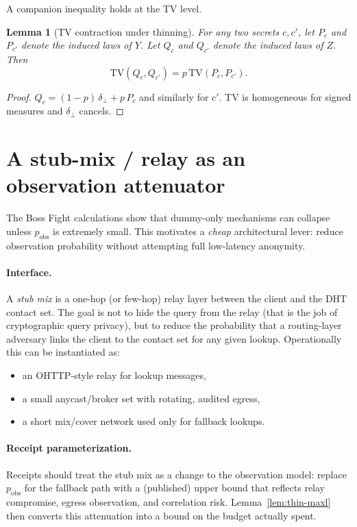 \documentclass[11pt]{article}
\newtheorem{lemma}{Lemma}
\theoremstyle{definition}
\newcommand{\TV}{\mathrm{TV}}
\begin{document}
A companion inequality holds at the TV level.

\begin{lemma}[TV contraction under thinning]\label{lem:thin-tv}
For any two secrets $c,c'$, let $P_c$ and $P_{c'}$ denote the induced laws of $Y$.
Let $Q_c$ and $Q_{c'}$ denote the induced laws of $Z$.
Then
\[ \TV(Q_c,Q_{c'}) = p\,\TV(P_c,P_{c'}). \]
\end{lemma}
\begin{proof}
$Q_c = (1-p)\,\delta_{\bot} + p\,P_c$ and similarly for $c'$.
TV is homogeneous for signed measures and $\delta_{\bot}$ cancels.
\end{proof}

\section{A stub-mix / relay as an observation attenuator}
The Boss Fight calculations show that dummy-only mechanisms can collapse unless $p_{\mathrm{obs}}$ is extremely small.\cite{series:bossfightB}
This motivates a \emph{cheap} architectural lever:
reduce observation probability without attempting full low-latency anonymity.

\paragraph{Interface.}
A \emph{stub mix} is a one-hop (or few-hop) relay layer between the client and the DHT contact set.
The goal is not to hide the query from the relay (that is the job of cryptographic query privacy), but to reduce the probability that a routing-layer adversary links the client to the contact set for any given lookup.
Operationally this can be instantiated as:
\begin{itemize}[leftmargin=1.2em]
\item an OHTTP-style relay for lookup messages,
\item a small anycast/broker set with rotating, audited egress,
\item a short mix/cover network used only for fallback lookups.
\end{itemize}

\paragraph{Receipt parameterization.}
Receipts should treat the stub mix as a change to the observation model:
replace $p_{\mathrm{obs}}$ for the fallback path with a (published) upper bound that reflects relay compromise, egress observation, and correlation risk.
Lemma~\ref{lem:thin-maxl} then converts this attenuation into a bound on the budget actually spent.
\end{document}
